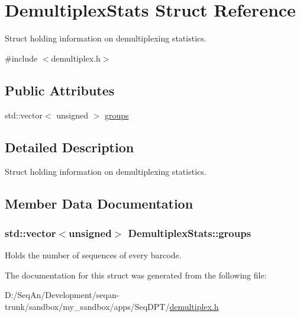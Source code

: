 \hypertarget{struct_demultiplex_stats}{\section{Demultiplex\-Stats Struct Reference}
\label{struct_demultiplex_stats}
}


Struct holding information on demultiplexing statistics.  




{\ttfamily \#include $<$demultiplex.\-h$>$}

\subsection*{Public Attributes}
\begin{DoxyCompactItemize}
\item 
std\-::vector$<$ unsigned $>$ \hyperlink{struct_demultiplex_stats_a92d012f999200b860f2e4ad664164ccb}{groups}
\end{DoxyCompactItemize}


\subsection{Detailed Description}
Struct holding information on demultiplexing statistics. 

\subsection{Member Data Documentation}
\hypertarget{struct_demultiplex_stats_a92d012f999200b860f2e4ad664164ccb}{
\subsubsection[{groups}]{\setlength{\rightskip}{0pt plus 5cm}std\-::vector$<$unsigned$>$ Demultiplex\-Stats\-::groups}}\label{struct_demultiplex_stats_a92d012f999200b860f2e4ad664164ccb}
Holds the number of sequences of every barcode. 

The documentation for this struct was generated from the following file\-:\begin{DoxyCompactItemize}
\item 
D\-:/\-Seq\-An/\-Development/seqan-\/trunk/sandbox/my\-\_\-sandbox/apps/\-Seq\-D\-P\-T/\hyperlink{demultiplex_8h}{demultiplex.\-h}\end{DoxyCompactItemize}

